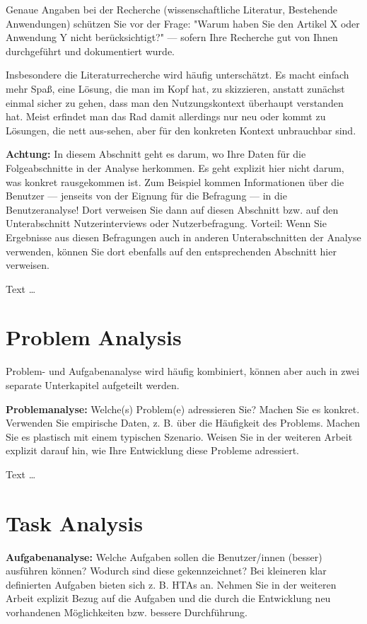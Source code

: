 \documentclass[11pt,a4paper,english]{scrreprt}
\newenvironment{comment}
  {\par\medskip
   \begingroup\color{olive}%
   }
 {\endgroup
  \medskip}
\begin{document}
\begin{comment}
Genaue Angaben bei der Recherche (wissenschaftliche Literatur, Bestehende Anwendungen) schützen Sie vor der Frage: "Warum haben Sie den Artikel X oder Anwendung Y nicht berücksichtigt?" — sofern Ihre Recherche gut von Ihnen durchgeführt und dokumentiert wurde.

Insbesondere die Literaturrecherche wird häufig unterschätzt. Es macht einfach mehr Spaß, eine Lösung, die man im Kopf hat, zu skizzieren, anstatt zunächst einmal sicher zu gehen, dass man den Nutzungskontext überhaupt verstanden hat. Meist erfindet man das Rad damit allerdings nur neu oder kommt zu Lösungen, die nett aus-sehen, aber für den konkreten Kontext unbrauchbar sind.

\textbf{Achtung:} In diesem Abschnitt geht es darum, wo Ihre Daten für die Folgeabschnitte in der Analyse herkommen. Es geht explizit hier nicht darum, was konkret rausgekommen ist. Zum Beispiel kommen Informationen über die Benutzer — jenseits von der Eignung für die Befragung — in die Benutzeranalyse! Dort verweisen Sie dann auf diesen Abschnitt bzw. auf den Unterabschnitt Nutzerinterviews oder Nutzerbefragung. Vorteil: Wenn Sie Ergebnisse aus diesen Befragungen auch in anderen Unterabschnitten der Analyse verwenden, können Sie dort ebenfalls auf den entsprechenden Abschnitt hier verweisen.
\end{comment}

Text \dots

\section{Problem Analysis}
\begin{comment}
Problem- und Aufgabenanalyse wird häufig kombiniert, können aber auch in zwei separate Unterkapitel aufgeteilt werden.

\textbf{Problemanalyse:} Welche(s) Problem(e) adressieren Sie? Machen Sie es konkret. Verwenden Sie empirische Daten, z. B. über die Häufigkeit des Problems. Machen Sie es plastisch mit einem typischen Szenario. Weisen Sie in der weiteren Arbeit explizit darauf hin, wie Ihre Entwicklung diese Probleme adressiert.
\end{comment}

Text \dots

\section{Task Analysis}
\begin{comment}
\textbf{Aufgabenanalyse:} Welche Aufgaben sollen die Benutzer/innen (besser) ausführen können? Wodurch sind diese gekennzeichnet? Bei kleineren klar definierten Aufgaben bieten sich z. B. HTAs an. Nehmen Sie in der weiteren Arbeit explizit Bezug auf die Aufgaben und die durch die Entwicklung neu vorhandenen Möglichkeiten bzw. bessere Durchführung.
\end{comment}
\end{document}

